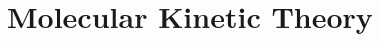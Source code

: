 \documentclass[main.tex]{subfiles}
\begin{document}
\chapter{Molecular Kinetic Theory}
\end{document}
